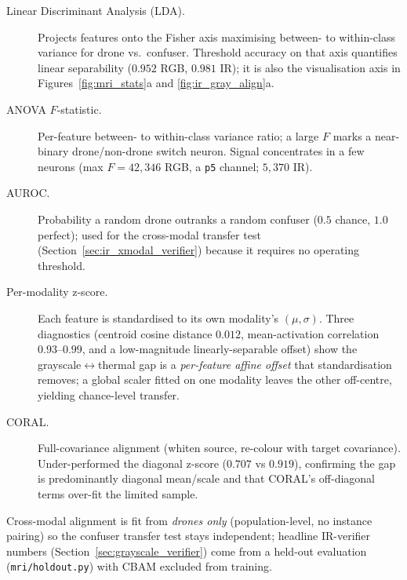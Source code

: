 \begin{description}
    \item[Linear Discriminant Analysis (LDA).] Projects features onto the Fisher axis maximising between- to within-class variance for drone vs.\ confuser. Threshold accuracy on that axis quantifies linear separability ($0.952$ RGB, $0.981$ IR); it is also the visualisation axis in Figures~\ref{fig:mri_stats}a and \ref{fig:ir_gray_align}a.
    \item[ANOVA $F$-statistic.] Per-feature between- to within-class variance ratio; a large $F$ marks a near-binary drone/non-drone switch neuron. Signal concentrates in a few neurons (max $F=42{,}346$ RGB, a \texttt{p5} channel; $5{,}370$ IR).
    \item[AUROC.] Probability a random drone outranks a random confuser ($0.5$ chance, $1.0$ perfect); used for the cross-modal transfer test (Section~\ref{sec:ir_xmodal_verifier}) because it requires no operating threshold.
    \item[Per-modality z-score.] Each feature is standardised to its own modality's $(\mu,\sigma)$. Three diagnostics (centroid cosine distance $0.012$, mean-activation correlation $0.93$--$0.99$, and a low-magnitude linearly-separable offset) show the grayscale$\leftrightarrow$thermal gap is a \emph{per-feature affine offset} that standardisation removes; a global scaler fitted on one modality leaves the other off-centre, yielding chance-level transfer.
    \item[CORAL.] Full-covariance alignment (whiten source, re-colour with target covariance). Under-performed the diagonal z-score ($0.707$ vs $0.919$), confirming the gap is predominantly diagonal mean/scale and that CORAL's off-diagonal terms over-fit the limited sample.
\end{description}

Cross-modal alignment is fit from \emph{drones only} (population-level, no instance pairing) so the confuser transfer test stays independent; headline IR-verifier numbers (Section~\ref{sec:grayscale_verifier}) come from a held-out evaluation (\texttt{mri/holdout.py}) with CBAM excluded from training.

